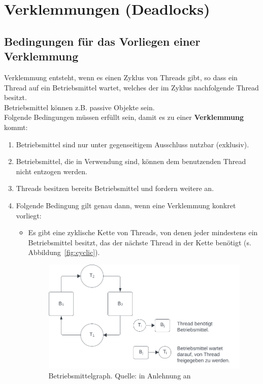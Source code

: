 \section{Verklemmungen (Deadlocks)}

 \subsection{Bedingungen für das Vorliegen einer Verklemmung}
Verklemmung entsteht, wenn es einen Zyklus von Threads gibt, so dass ein Thread auf ein Betriebsmittel wartet, welches der im Zyklus nachfolgende Thread besitzt.\\
Betriebsmittel können z.B. passive Objekte sein.\\

\noindent
Folgende Bedingungen müssen erfüllt sein, damit es zu einer \textbf{Verklemmung} kommt:

\begin{enumerate}
    \item Betriebsmittel sind nur unter gegenseitigem Ausschluss nutzbar (exklusiv).
    \item Betriebsmittel, die in Verwendung sind, können dem benutzenden Thread nicht entzogen werden.
    \item Threads besitzen bereits Betriebsmittel und fordern weitere an.
    \item Folgende Bedingung gilt genau dann, wenn eine Verklemmung konkret vorliegt:
    \begin{itemize}
        \item[] Es gibt eine zyklische Kette von Threads, von denen jeder mindestens ein Betriebsmittel besitzt, das der nächste Thread in der Kette benötigt (s. Abbildung~\ref{fig:cyclic}).
        \begin{figure}
            \centering
            \includegraphics[scale=0.5]{chapters/fopt2/img/cyclic}
            \caption{Betriebsmittelgraph. Quelle: in Anlehnung an \cite[192, Bild 3.9]{Oec22}}
        \end{figure}
    \end{itemize}
\end{enumerate}

